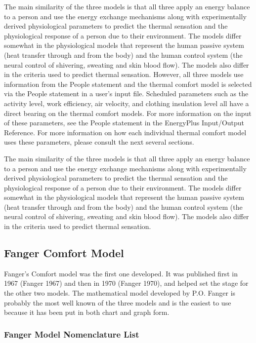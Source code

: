 The main similarity of the three models is that all three apply an energy balance to a person and use the energy exchange mechanisms along with experimentally derived physiological parameters to predict the thermal sensation and the physiological response of a person due to their environment. The models differ somewhat in the physiological models that represent the human passive system (heat transfer through and from the body) and the human control system (the neural control of shivering, sweating and skin blood flow). The models also differ in the criteria used to predict thermal sensation. However, all three models use information from the People statement and the thermal comfort model is selected via the People statement in a user's input file. Scheduled parameters such as the activity level, work efficiency, air velocity, and clothing insulation level all have a direct bearing on the thermal comfort models. For more information on the input of these parameters, see the People statement in the EnergyPlus Input/Output Reference. For more information on how each individual thermal comfort model uses these parameters, please consult the next several sections.

The main similarity of the three models is that all three apply an energy balance to a person and use the energy exchange mechanisms along with experimentally derived physiological parameters to predict the thermal sensation and the physiological response of a person due to their environment. The models differ somewhat in the physiological models that represent the human passive system (heat transfer through and from the body) and the human control system (the neural control of shivering, sweating and skin blood flow). The models also differ in the criteria used to predict thermal sensation.

\subsection{Fanger Comfort Model}\label{fanger-comfort-model}

Fanger's Comfort model was the first one developed. It was published first in 1967 (Fanger 1967) and then in 1970 (Fanger 1970), and helped set the stage for the other two models. The mathematical model developed by P.O. Fanger is probably the most well known of the three models and is the easiest to use because it has been put in both chart and graph form.

\subsubsection{Fanger Model Nomenclature List}\label{fanger-model-nomenclature-list}

